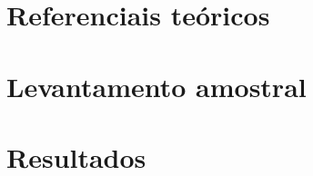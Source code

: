\part{Referenciais teóricos}



\part{Levantamento amostral}

\part{Resultados}



\postextual



%

%

\printindex


